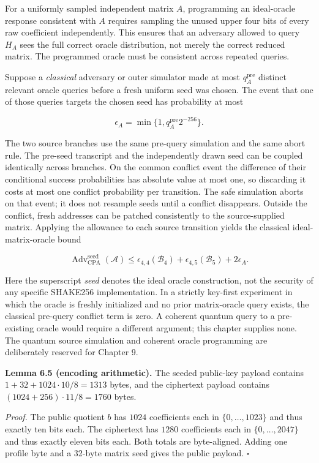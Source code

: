 \documentclass[
  11pt,
  a4paper,
  oneside]{report}
\begin{document}
For a uniformly sampled independent matrix \(A\), programming an
ideal-oracle response consistent with \(A\) requires sampling the unused
upper four bits of every raw coefficient independently. This ensures
that an adversary allowed to query \(H_A\) sees the full correct oracle
distribution, not merely the correct reduced matrix. The programmed
oracle must be consistent across repeated queries.

Suppose a \emph{classical} adversary or outer simulator made at most
\(q_A^{\mathrm{pre}}\) distinct relevant oracle queries before a fresh
uniform seed was chosen. The event that one of those queries targets the
chosen seed has probability at most

\[
\epsilon_A=\min\{1,q_A^{\mathrm{pre}}2^{-256}\}.
\]

The two source branches use the same pre-query simulation and the same
abort rule. The pre-seed transcript and the independently drawn seed can
be coupled identically across branches. On the common conflict event the
difference of their conditional success probabilities has absolute value
at most one, so discarding it costs at most one conflict probability per
transition. The safe simulation aborts on that event; it does not
resample seeds until a conflict disappears. Outside the conflict, fresh
addresses can be patched consistently to the source-supplied matrix.
Applying the allowance to each source transition yields the classical
ideal-matrix-oracle bound

\[
\boxed{
\operatorname{Adv}_{\mathrm{CPA}}^{\mathrm{seed}}(\mathcal A)
\le\epsilon_{4,4}(\mathcal B_4)+\epsilon_{4,5}(\mathcal B_5)
+2\epsilon_A.}
\]

Here the superscript \emph{seed} denotes the ideal oracle construction,
not the security of any specific SHAKE256 implementation. In a strictly
key-first experiment in which the oracle is freshly initialized and no
prior matrix-oracle query exists, the classical pre-query conflict term
is zero. A coherent quantum query to a pre-existing oracle would require
a different argument; this chapter supplies none. The quantum source
simulation and coherent oracle programming are deliberately reserved for
Chapter 9.

\textbf{Lemma 6.5 (encoding arithmetic).} The seeded public-key payload
contains \(1+32+1024\cdot10/8=1313\) bytes, and the ciphertext payload
contains \((1024+256)\cdot11/8=1760\) bytes.

\emph{Proof.} The public quotient \(b\) has \(1024\) coefficients each
in \(\{0,\ldots,1023\}\) and thus exactly ten bits each. The ciphertext
has \(1280\) coefficients each in \(\{0,\ldots,2047\}\) and thus exactly
eleven bits each. Both totals are byte-aligned. Adding one profile byte
and a 32-byte matrix seed gives the public payload. \(\square\)
\end{document}
